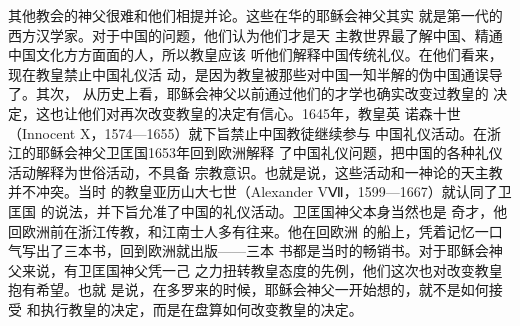 其他教会的神父很难和他们相提并论。这些在华的耶稣会神父其实%
就是第一代的西方汉学家。对于中国的问题，他们认为他们才是天%
主教世界最了解中国、精通中国文化方方面面的人，所以教皇应该%
听他们解释中国传统礼仪。在他们看来，现在教皇禁止中国礼仪活%
动，是因为教皇被那些对中国一知半解的伪中国通误导了。其次，%
从历史上看，耶稣会神父以前通过他们的才学也确实改变过教皇的%
决定，这也让他们对再次改变教皇的决定有信心。1645年，教皇英%
诺森十世（Innocent X，1574—1655）就下旨禁止中国教徒继续参与%
中国礼仪活动。在浙江的耶稣会神父卫匡国1653年回到欧洲解释%
了中国礼仪问题，把中国的各种礼仪活动解释为世俗活动，不具备%
宗教意识。也就是说，这些活动和一神论的天主教并不冲突。当时%
的教皇亚历山大七世（Alexander VⅦ，1599—1667）就认同了卫匡国%
的说法，并下旨允准了中国的礼仪活动。卫匡国神父本身当然也是%
奇才，他回欧洲前在浙江传教，和江南士人多有往来。他在回欧洲%
的船上，凭着记忆一口气写出了三本书，回到欧洲就出版——三本%
书都是当时的畅销书。对于耶稣会神父来说，有卫匡国神父凭一己%
之力扭转教皇态度的先例，他们这次也对改变教皇抱有希望。也就%
是说，在多罗来的时候，耶稣会神父一开始想的，就不是如何接受%
和执行教皇的决定，而是在盘算如何改变教皇的决定。%
